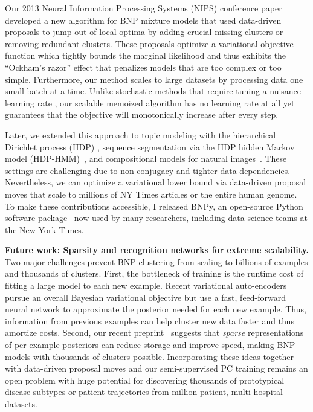 \documentclass[11pt,letterpaper]{article}
\begin{document}
Our 2013 Neural Information Processing Systems (NIPS) conference paper~\cite{hughes2013moVB} developed a new algorithm for BNP mixture models that used data-driven proposals to jump out of local optima by adding crucial missing clusters or removing redundant clusters. 
These proposals optimize a variational objective function which tightly bounds the marginal likelihood and thus exhibits the ``Ockham's razor'' effect that penalizes models that are too complex or too simple.
Furthermore, our method scales to large datasets by processing data one small batch at a time. Unlike stochastic methods that require tuning a nuisance learning rate \cite{hoffman2013svi}, our scalable memoized algorithm has no learning rate at all yet guarantees that the objective will monotonically increase after every step.

Later, we extended this approach to topic modeling with the hierarchical Dirichlet process (HDP) \citep{hughes2015hdpreliable}, sequence segmentation via the HDP hidden Markov model (HDP-HMM)~\citep{hughes2015hdphmm},
and compositional models for natural images~\citep{ji2017hdpgrid}.
These settings are challenging due to non-conjugacy and tighter data dependencies.
Nevertheless, we can optimize a variational lower bound via data-driven proposal moves that scale to millions of NY Times articles or the entire human genome.
To make these contributions accessible, I released BNPy, an open-source Python software package~\citep{hughes2017bnpy} now used by many researchers, including data science teams at the New York Times.

\textbf{Future work: Sparsity and recognition networks for extreme scalability.}
Two major challenges prevent BNP clustering from scaling to billions of examples and thousands of clusters. First, the bottleneck of training is the runtime cost of fitting a large model to each new example. Recent variational auto-encoders
~\citep{kingma2014autoencodingVB,mnih2014neuralVariational} 
pursue an overall Bayesian variational objective but use a 
fast, feed-forward neural network to 
approximate the posterior needed for each new example. Thus, information from previous examples can help cluster new data faster and thus amortize costs. 
Second, our recent preprint~\citep{hughes2016sparse} suggests that \emph{sparse} representations of per-example posteriors can reduce storage and improve speed, making BNP models with thousands of clusters possible.
Incorporating these ideas together with data-driven proposal moves and our
semi-supervised PC training remains an open problem with huge potential for 
discovering thousands of prototypical disease subtypes or patient trajectories from million-patient, multi-hospital datasets.
\end{document}
